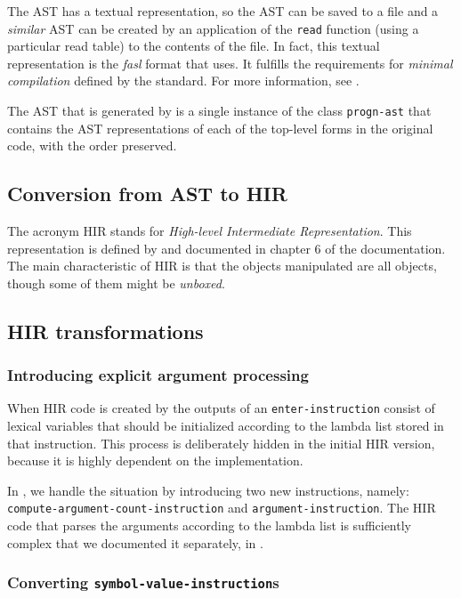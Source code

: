 The AST has a textual representation, so the AST can be saved to a
file and a \emph{similar} AST can be created by an application of the
\texttt{read} function (using a particular read table) to the contents
of the file.  In fact, this textual representation is the \emph{fasl}
format that \sysname{} uses.  It fulfills the requirements for
\emph{minimal compilation} defined by the \commonlisp{} standard.
For more information, see .

The AST that is generated by \cleavir{} is a single instance of the
class \texttt{progn-ast} that contains the AST representations of each
of the top-level forms in the original code, with the order preserved.

\subsection{Conversion from AST to HIR}

The acronym HIR stands for \emph{High-level Intermediate
  Representation}.  This representation is defined by \cleavir{} and
documented in chapter 6 of the \cleavir{} documentation.
The main characteristic of HIR is that the objects manipulated are all
\commonlisp{} objects, though some of them might be \emph{unboxed}.

\subsection{HIR transformations}

\subsubsection{Introducing explicit argument processing}

When HIR code is created by \cleavir{} the outputs of an
\texttt{enter-instruction} consist of lexical variables that should be
initialized according to the lambda list stored in that instruction.
This process is deliberately hidden in the initial HIR version,
because it is highly dependent on the implementation.

In \sysname{}, we handle the situation by introducing two new
instructions, namely: \texttt{compute-argument-count-instruction} and
\texttt{argument-instruction}.  The HIR code that parses the arguments
according to the lambda list is sufficiently complex that we
documented it separately, in .

\subsubsection{Converting \texttt{symbol-value-instruction}s}

